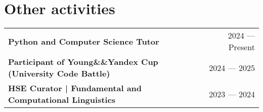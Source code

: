 \documentclass[a4paper,10pt]{article}
\begin{document}

\section{Other activities}
\setlength{\tabcolsep}{2.7cm}

\begin{tabularx}{\linewidth}{ @{}l r@{}}
\textbf{Python and Computer Science Tutor} & 2024 –– Present \\[3.75pt]

\textbf{Participant of Young\&\&Yandex Cup (University Code Battle)} & 2024 –– 2025 \\[3.75pt]

\textbf{HSE Curator | Fundamental and Computational Linguistics} & 2023 –– 2024 \\ [3.75pt]

\end{tabularx}


\end{document}
